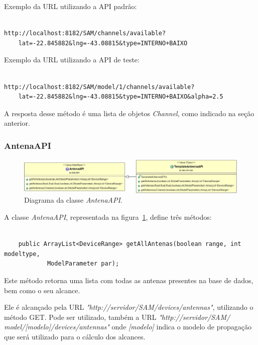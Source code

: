 \FloatBarrier

Exemplo da URL utilizando a API padrão:

\begin{lstlisting}	

http://localhost:8182/SAM/channels/available?
	lat=-22.845882&lng=-43.08815&type=INTERNO+BAIXO

\end{lstlisting}

Exemplo da URL utilizando a API de teste:

\begin{lstlisting}			

http://localhost:8182/SAM/model/1/channels/available?
	lat=-22.845882&lng=-43.08815&type=INTERNO+BAIXO&alpha=2.5

\end{lstlisting}



A resposta desse método é uma lista de objetos \textit{Channel}, como indicado na seção anterior.

\subsubsection{AntenaAPI}

\begin{figure}[htb]
\centering
\includegraphics[width=1.0\textwidth]{figs/antenaapi}
\caption[\textit{Diagrama da classe \textit{AntenaAPI} }.]
{Diagrama da classe \textit{AntenaAPI}.}
\label{fig:AntenaAPI}
\end{figure} 


\FloatBarrier

A classe \textit{AntenaAPI}, representada na figura~\ref{fig:AntenaAPI}, define três métodos:

\begin{lstlisting}

	public ArrayList<DeviceRange> getAllAntenas(boolean range, int modeltype, 
			ModelParameter par);

\end{lstlisting}

Este método retorna uma lista com todas as antenas presentes na base de dados, bem como o seu alcance.

Ele é alcançado pela URL \textit{"http://servidor/SAM/devices/antennas"}, utilizando o método GET. Pode ser utilizado, também a URL \textit{"http://servidor/SAM/ model/[modelo]/devices/antennas"} onde \textit{[modelo]} indica o modelo de propagação que será utilizado para o cálculo dos alcances.

